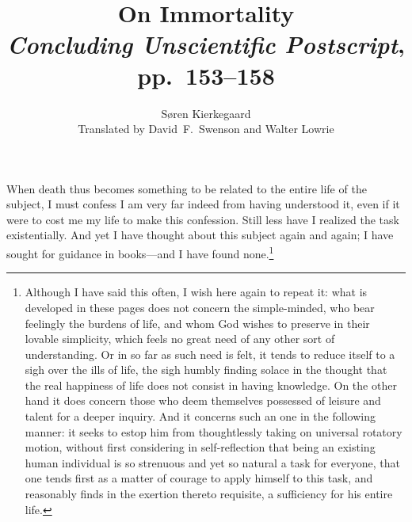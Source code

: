 \documentclass[12pt]{article}
\title{On Immortality\\[0.5em]
  \large\textit{Concluding Unscientific Postscript}, pp.\ 153--158}
\author{S\o{}ren Kierkegaard\\[0.4em]
  \small Translated by David~F.\ Swenson and Walter Lowrie}
\date{}
\begin{document}
\maketitle

\noindent
When death thus becomes something to be related to the entire life of
the subject, I must confess I am very far indeed from having understood
it, even if it were to cost me my life to make this confession. Still
less have I realized the task existentially. And yet I have thought
about this subject again and again; I have sought for guidance in
books---and I have found none.\footnote{Although I have said this
often, I wish here again to repeat it: what is developed in these
pages does not concern the simple-minded, who bear feelingly the
burdens of life, and whom God wishes to preserve in their lovable
simplicity, which feels no great need of any other sort of
understanding. Or in so far as such need is felt, it tends to reduce
itself to a sigh over the ills of life, the sigh humbly finding solace
in the thought that the real happiness of life does not consist in
having knowledge. On the other hand it does concern those who deem
themselves possessed of leisure and talent for a deeper inquiry. And
it concerns such an one in the following manner: it seeks to estop him
from thoughtlessly taking on universal rotatory motion, without first
considering in self-reflection that being an existing human individual
is so strenuous and yet so natural a task for everyone, that one tends
first as a matter of courage to apply himself to this task, and
reasonably finds in the exertion thereto requisite, a sufficiency for
his entire life.}
\end{document}
